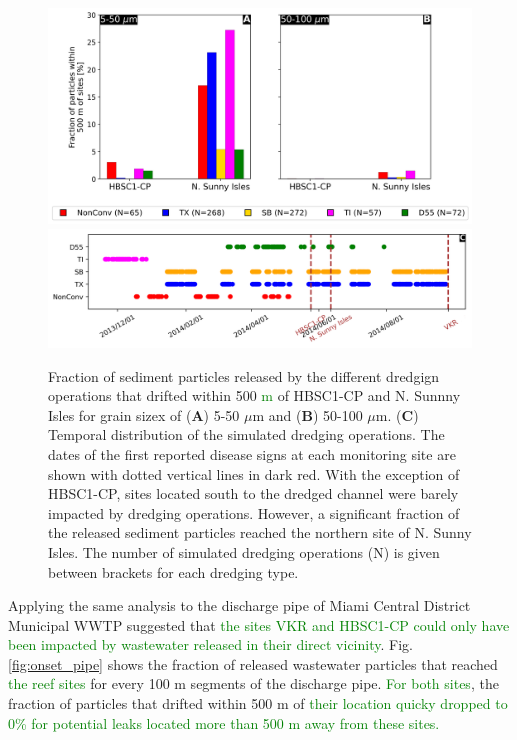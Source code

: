 \documentclass[preprint,12pt,authoryear]{elsarticle}
\newcommand{\modif}[1]{\textcolor{green}{#1}}
\begin{document}
\begin{figure}
	\centering
	\includegraphics[width=\textwidth]{figures/aggregated_new_vv.png}
	\includegraphics[width=\textwidth]{figures/timeline_new.png}
	\caption{Fraction of sediment particles released by the different dredgign operations that drifted within 500 \modif{m} of HBSC1-CP and N. Sunnny Isles for grain sizex of (\textbf{A}) 5-50 $\mu$m  and (\textbf{B}) 50-100 $\mu$m. (\textbf{C}) Temporal distribution of the simulated dredging operations. The dates of the first reported disease signs at each monitoring site are shown with dotted vertical lines in dark red. With the exception of HBSC1-CP, sites located south to the dredged channel were barely impacted by dredging operations. However, a significant fraction of the released sediment particles reached the northern site of N. Sunny Isles. The number of simulated dredging operations (N) is given between brackets for each dredging type.}
	\label{fig:onset_bar}
\end{figure}

Applying the same analysis to the discharge pipe of Miami Central District Municipal WWTP suggested that \modif{the sites VKR and HBSC1-CP could only have been impacted by wastewater released in their direct vicinity}. Fig. \ref{fig:onset_pipe} shows the fraction of released wastewater particles that reached \modif{the reef sites} for every 100 m segments of the discharge pipe. \modif{For both sites}, the fraction of particles that drifted within 500 m of \modif{their location quicky dropped to 0\% for potential leaks located more than 500 m away from these sites.}
\end{document}
